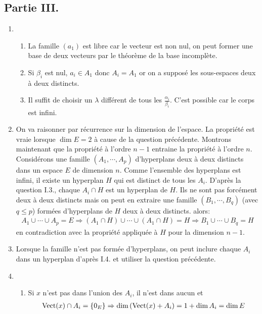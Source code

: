 \subsection*{Partie III.}
\begin{enumerate}
 \item \begin{enumerate}
\item La famille $(a_1)$ est libre car le vecteur est non nul, on peut former une base de deux vecteurs par le théorème de la base incomplète.
\item Si $\beta_i$ est nul, $a_i\in A_1$ donc $A_i = A_1$ or on a supposé les sous-espaces deux à deux distincts.
\item Il suffit de choisir un $\lambda$ différent de tous les $\frac{\alpha_i}{\beta_i}$. C'est possible car le corps est infini.
\end{enumerate}
\item On va raisonner par récurrence sur la dimension de l'espace.\newline
La propriété est vraie lorsque $\dim E=2$ à cause de la question précédente.\newline
Montrons maintenant que la propriété à l'ordre $n-1$ entraine la propriété à l'ordre $n$.\newline
Considérons une famille $(A_1,\cdots, A_p)$ d'hyperplans deux à deux distincts dans un espace $E$ de dimension $n$. Comme l'ensemble des hyperplans est infini, il existe un hyperplan $H$ qui est distinct de tous les $A_i$. D'après la question I.3., chaque $A_i\cap H$ est un hyperplan de $H$. Ils ne sont pas forcément deux à deux distincts mais on peut en extraire une famille $(B_1,\cdots ,B_q)$ (avec $q\leq p$) formées d'hyperplans de $H$ deux à deux distincts. alors:
\begin{multline*}
 A_1\cup \cdots \cup A_p = E \Rightarrow (A_1\cap H) \cup \cdots \cup (A_1\cap H) = H 
\Rightarrow B_1 \cup \cdots \cup B_q = H 
\end{multline*}
en contradiction avec la propriété appliquée à $H$ pour la dimension $n-1$.
\item Lorsque la famille n'est pas formée d'hyperplans, on peut inclure chaque $A_i$ dans un hyperplan d'après I.4. et utiliser la question précédente.
\item \begin{enumerate}
\item Si $x$ n'est pas dans l'union des $A_i$, il n'est dans aucun et 
\begin{align*}
\Vect(x)\cap A_i = \{0_E\} \Rightarrow \dim\left( \Vect(x)+ A_i\right)= 1 + \dim A_i = \dim E \\

\end{align*}
\end{enumerate}
\end{enumerate}
